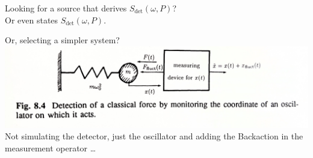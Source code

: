 \documentclass{beamer}
\begin{document}
\begin{frame}
	\centering
	Looking for a source that derives $S_\text{det}(\omega, P)$?\\
	\small
	Or even states $S_\text{det}(\omega, P)$.
\end{frame}

\begin{frame}{Or, selecting a simpler system?}
	\includegraphics[width=\textwidth]{figures/Fig. 8.4.jpg}
	Not simulating the detector, just the oscillator and adding the Backaction in the measurement operator \dots
\end{frame}


{
	\begin{frame}[plain]{}\end{frame}
}
\end{document}
